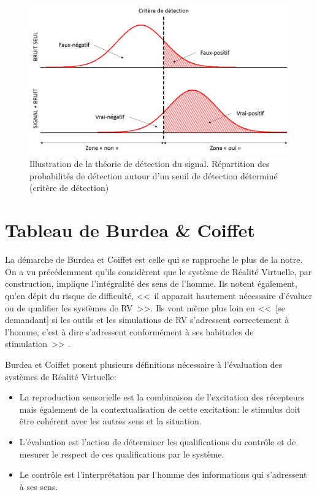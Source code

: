 		\begin{figure}
			\centering
			\includegraphics[scale=.5]{Figures/SignalDetectionTheory}
			\caption{Illustration de la théorie de détection du signal. Répartition des probabilités de détection autour d'un seuil de détection déterminé (critère de détection)}
			\label{fig:signal_detection_theory}
		\end{figure}
		
		\section{Tableau de Burdea \& Coiffet}
		\par La démarche de Burdea et Coiffet est celle qui se rapproche le plus de la notre. On a vu précédemment qu'ils considèrent que le système de Réalité Virtuelle, par construction, implique l'intégralité des sens de l'homme. Ils notent également, qu'en dépit du risque de difficulté, <<~il apparait hautement nécessaire d'évaluer ou de qualifier les systèmes de RV~>>. Ils vont même plus loin en <<~[se demandant] si les outils et les simulations de RV s'adressent correctement à l'homme, c'est à dire s'adressent conformément à ses habitudes de stimulation~>> \citep{burdea_realite_1993}.
		
		\par Burdea et Coiffet posent plusieurs définitions nécessaire à l'évaluation des systèmes de Réalité Virtuelle:
		\begin{itemize}
			\item La reproduction sensorielle est la combinaison de l'excitation des récepteurs mais également de la contextualisation de cette excitation: le stimulus doit être cohérent avec les autres sens et la situation.
			\item L'évaluation est l'action de déterminer les qualifications du contrôle et de mesurer le respect de ces qualifications par le système.
			\item Le contrôle est l'interprétation par l'homme des informations qui s'adressent à ses sens.
		\end{itemize}
		
